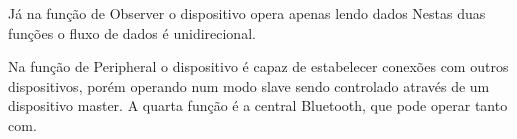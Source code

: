 Já na função de Observer o dispositivo opera apenas lendo dados Nestas duas
funções o fluxo de dados é unidirecional.

Na função de Peripheral o dispositivo é capaz de estabelecer conexões com
outros dispositivos, porém operando num modo slave sendo controlado através de
um dispositivo master. A quarta função é a central Bluetooth, que pode operar tanto com.











